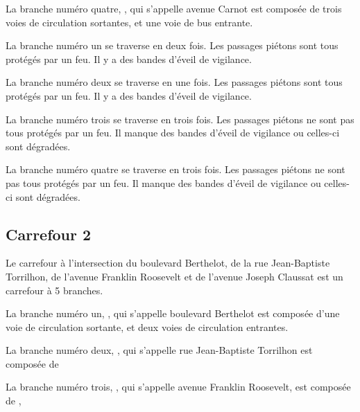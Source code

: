 \begin{appendix}
\newpar{}

La branche numéro quatre, ,  qui s'appelle avenue Carnot est composée de trois voies de circulation sortantes, et une voie de bus entrante.

\newpar{}

La branche numéro un se traverse en deux fois. Les passages piétons sont tous protégés par un feu. Il y a des bandes d'éveil de vigilance.

\newpar{}

La branche numéro deux se traverse en une fois. Les passages piétons sont tous protégés par un feu. Il y a des bandes d'éveil de vigilance.

\newpar{}

La branche numéro trois se traverse en trois fois. Les passages piétons ne sont pas tous protégés par un feu. Il manque des bandes d'éveil de vigilance ou celles-ci sont dégradées.

\newpar{}

La branche numéro quatre se traverse en trois fois. Les passages piétons ne sont pas tous protégés par un feu. Il manque des bandes d'éveil de vigilance ou celles-ci sont dégradées.

\subsection*{Carrefour 2}

\label{annexe:q_ID56_carrefour2}

Le carrefour à l'intersection du boulevard Berthelot, de la rue Jean-Baptiste Torrilhon, de l'avenue Franklin Roosevelt et de l'avenue Joseph Claussat est un carrefour à 5 branches.

\newpar{}

La branche numéro un, , qui s'appelle boulevard Berthelot est composée d'une voie de circulation sortante, et deux voies de circulation entrantes.

\newpar{}

La branche numéro deux, , qui s'appelle rue Jean-Baptiste Torrilhon est composée de 

\newpar{}

La branche numéro trois, , qui s'appelle avenue Franklin Roosevelt, est composée de , 

\newpar{}


\end{appendix}
